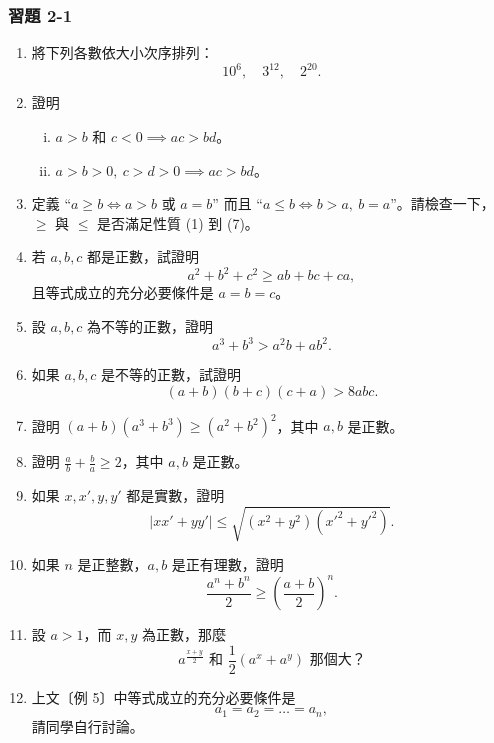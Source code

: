 \subsubsection*{習題 2-1}

\begin{enumerate}
    \item 將下列各數依大小次序排列：
    \[
    10^6,\quad 3^{12},\quad 2^{20}.
    \]

    \item 證明
    \begin{enumerate}[(i)]
        \item $a>b \text{ 和 } c<0 \implies ac>bd$。\label{note:b2-ch2-p30-ex2-1-q2i}
        \item $a>b>0,\ c>d>0 \implies ac>bd$。
    \end{enumerate}

    \item 定義 ``$a\ge b \iff a>b \text{ 或 } a=b$'' 而且 ``$a\le b \iff b>a,\ b=a$''。請檢查一下，$\ge$ 與 $\le$ 是否滿足性質 (1) 到 (7)。

    \item 若 $a, b, c$ 都是正數，試證明
    \[
    a^2+b^2+c^2 \ge ab+bc+ca,
    \]
    且等式成立的充分必要條件是 $a=b=c$。

    \item 設 $a, b, c$ 為不等的正數，證明
    \[
    a^3+b^3 > a^2 b+ab^2.
    \]

    \item 如果 $a, b, c$ 是不等的正數，試證明
    \[
    (a+b)(b+c)(c+a) > 8abc.
    \]

    \item 證明 $(a+b)(a^3+b^3) \ge (a^2+b^2)^2$，其中 $a, b$ 是正數。

    \item 證明 $\frac{a}{b}+\frac{b}{a} \ge 2$，其中 $a, b$ 是正數。

    \item 如果 $x, x', y, y'$ 都是實數，證明
    \[
    |xx'+yy'| \le \sqrt{(x^2+y^2)(x'^2+y'^2)}.
    \]

    \item 如果 $n$ 是正整數，$a, b$ 是正有理數，證明
    \[
    \frac{a^n+b^n}{2} \ge \left(\frac{a+b}{2}\right)^n.
    \]

    \item 設 $a>1$，而 $x, y$ 為正數，那麼
    \[
    a^{\frac{x+y}{2}} \text{ 和 } \frac{1}{2}(a^x+a^y) \text{ 那個大？}
    \]

    \item 上文〔例 5〕中等式成立的充分必要條件是
    \[
    a_1=a_2=\dots=a_n,
    \]
    請同學自行討論。
\end{enumerate}

